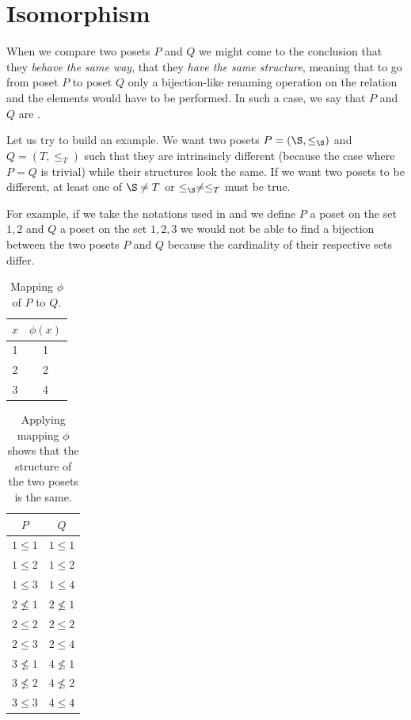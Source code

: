 \section{Isomorphism}

When we compare two posets $P$ and $Q$ we might come to the conclusion that
they \emph{behave the same way}, that they \emph{have the same structure},
meaning that to go from poset $P$ to poset $Q$ only a bijection-like renaming
operation on the relation and the elements would have to be performed. In such
a case, we say that $P$ and $Q$ are .

Let us try to build an example. We want two posets $P = (\S, \le_{\S})$ and $Q =
(T, \le_T)$ such that they are intrinsincly different (because the case where
$P = Q$ is trivial) while their structures look the same. If we want two posets
to be different, at least one of $\S \neq T$ or $\le_{\S} \neq \le_T$ must be true.

For example, if we take the notations used in  and we
define $P$ a poset on the set ${1, 2}$ and $Q$ a poset on the set ${1, 2, 3}$
we would not be able to find a bijection between the two posets $P$ and $Q$
because the cardinality of their respective sets differ.

\begin{table}
\centering
\caption{Mapping $\phi$ of $P$ to $Q$.}
\label{table:poset:iso:a}
\begin{tabular}{c|c}
	$x$ & $\phi(x)$ \\
	\hline
	1 & 1 \\
	2 & 2 \\
	3 & 4 \\
\end{tabular}
\end{table}

\begin{table}
\centering
\caption{Applying mapping $\phi$ shows that the structure of the two posets is
the same.}
\label{table:poset:iso:b}
\begin{tabular}{c|c}
	$P$ & $Q$\\
	\hline
	$1 \le 1$   & $1 \le 1$\\
	$1 \le 2$   & $1 \le 2$\\
	$1 \le 3$   & $1 \le 4$\\
	$2 \nleq 1$ & $2 \nleq 1$\\
	$2 \le 2$   & $2 \le 2$\\
	$2 \le 3$   & $2 \le 4$\\
	$3 \nleq 1$ & $4 \nleq 1$\\
	$3 \nleq 2$ & $4 \nleq 2$\\
	$3 \le 3$   & $4 \le 4$\\
\end{tabular}
\end{table}

